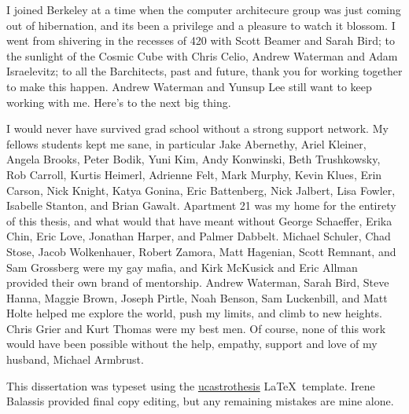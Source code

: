 \documentclass[12pt]{myucthesis}
\begin{document}
\begin{frontmatter}
\begin{acknowledgements}
I joined Berkeley at a time when the computer architecure group was just coming out of hibernation,
and its been a privilege and a pleasure to watch it blossom.
I went from shivering in the recesses of 420 with Scott Beamer and Sarah Bird;
to the sunlight of the Cosmic Cube with Chris Celio, Andrew Waterman and Adam Israelevitz;
to all the Barchitects, past and future, thank you for working together to make this happen.
Andrew Waterman and Yunsup Lee still want to keep working with me.
Here's to the next big thing.

I would never have survived grad school without a strong support network.
My fellows students kept me sane, in particular
Jake Abernethy, Ariel Kleiner, Angela Brooks, Peter Bodik, Yuni Kim,
Andy Konwinski, Beth Trushkowsky, Rob Carroll, Kurtis Heimerl, Adrienne Felt, Mark Murphy,
Kevin Klues, Erin Carson, Nick Knight, Katya Gonina, Eric Battenberg, Nick Jalbert,
Lisa Fowler, Isabelle Stanton, and Brian Gawalt.
Apartment 21 was my home for the entirety of this thesis, and what would that have meant without
George Schaeffer, Erika Chin, Eric Love, Jonathan Harper, and Palmer Dabbelt.
Michael Schuler, Chad Stose, Jacob Wolkenhauer, Robert Zamora, Matt Hagenian,
Scott Remnant, and Sam Grossberg were my gay mafia, and 
Kirk McKusick and Eric Allman provided their own brand of mentorship.
Andrew Waterman, Sarah Bird, Steve Hanna, Maggie Brown, Joseph Pirtle, Noah Benson, Sam Luckenbill, and Matt Holte
helped me explore the world, push my limits, and climb to new heights.
Chris Grier and Kurt Thomas were my best men.
Of course, none of this work would have been possible without the help, empathy,  support and love
 of my husband, Michael Armbrust.


This dissertation was typeset using the
\href{https://github.com/pkgw/ucastrothesis}{\textsf{ucastrothesis}}
\LaTeX\ template.
Irene Balassis provided final copy editing, but any remaining mistakes are mine alone.

\end{acknowledgements}
\end{frontmatter}








{}
\end{document}
